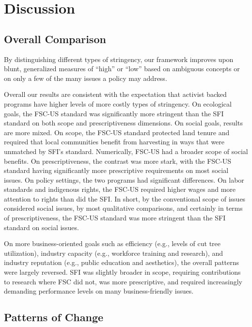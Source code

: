 \documentclass[
      12pt,
            Review ]{article}
\begin{document}
\hypertarget{discussion}{%
\section{Discussion}\label{discussion}}

\hypertarget{overall-comparison}{%
\subsection{Overall Comparison}\label{overall-comparison}}

By distinguishing different types of stringency, our framework improves upon blunt, generalized measures of ``high'' or ``low'' based on ambiguous concepts or on only a few of the many issues a policy may address.

Overall our results are consistent with the expectation that activist backed programs have higher levels of more costly types of stringency. On ecological goals, the FSC-US standard was significantly more stringent than the SFI standard on both scope and prescriptiveness dimensions. On social goals, results are more mixed. On scope, the FSC-US standard protected land tenure and required that local communities benefit from harvesting in ways that were unmatched by SFI's standard. Numerically, FSC-US had a broader scope of social benefits. On prescriptiveness, the contrast was more stark, with the FSC-US standard having significantly more prescriptive requirements on most social issues. On policy settings, the two programs had significant differences. On labor standards and indigenous rights, the FSC-US required higher wages and more attention to rights than did the SFI. In short, by the conventional scope of issues considered social issues, by most qualitative comparisons, and certainly in terms of prescriptiveness, the FSC-US standard was more stringent than the SFI standard on social issues.

On more business-oriented goals such as efficiency (e.g., levels of cut tree utilization), industry capacity (e.g., workforce training and research), and industry reputation (e.g., public education and aesthetics), the overall patterns were largely reversed. SFI was slightly broader in scope, requiring contributions to research where FSC did not, was more prescriptive, and required increasingly demanding performance levels on many business-friendly issues.

\hypertarget{patterns-of-change}{%
\subsection{Patterns of Change}\label{patterns-of-change}}
\end{document}
